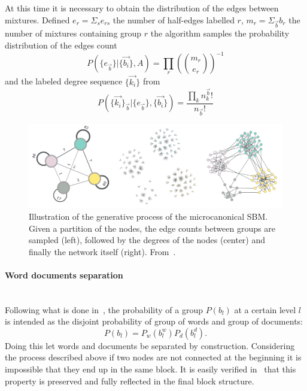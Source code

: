 At this time it is necessary to obtain the distribution of the edges between mixtures. Defined $e_r=\Sigma_s e_{rs}$ the number of half-edges labelled $r$, $m_r=\Sigma_{\vec{b}} b_r$ the number of mixtures containing group $r$ the algorithm samples the probability distribution of the edges count
\[P(\{e_{\vec{b}}\}|\{\vec{b_i}\}, A)=\prod_r\left(\binom{m_r}{e_r}\right)^{-1}\] and the labeled degree sequence $\{\vec{k_i}\}$ from \[P(\{\vec{k_i}\}_{\vec{b}}|\{e_{\vec{b}}\}, \{\vec{b_i}\})=\frac{\prod_k n_k^{\vec{b}}!}{n_{\vec{b}}!}\]
\begin{figure}[htb]
	\centering
	\includegraphics[width=0.8\linewidth]{pictures/topic/peixioto_passages.png}
	\caption{Illustration of the generative process of the microcanonical SBM. Given a partition of the
		nodes, the edge counts between groups are sampled (left), followed by the degrees of the nodes (center) and finally
		the network itself (right). From~\cite{Peixoto2017}.}
	\label{fig:hsbm-sum}
\end{figure}

\paragraph{Word documents separation}\mbox{}\\
Following what is done in~\cite{gerlach2018network}, the probability of a group $P(b_l)$ at a certain level $l$ is intended as the disjoint probability of group of words and group of documents:
\begin{equation}
  P(b_l)=P_w(b_l^w)P_d(b_l^d).
\end{equation}
Doing this let words and documents be separated by construction. Considering the process described above if two nodes are not connected at the beginning it is impossible that they end up in the same block. It is easily verified in~\cite{peixoto2014efficient} that this property is preserved and fully reflected in the final block structure.

